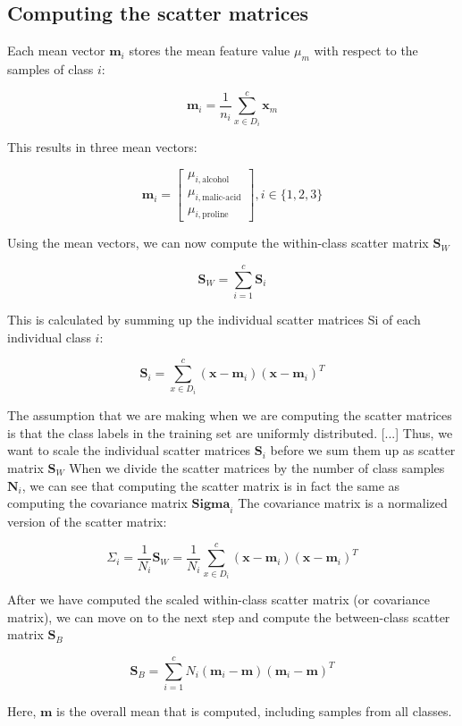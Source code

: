 \documentclass[letterpaper]{report}
\begin{document}
\subsection{Computing the scatter matrices}

Each mean vector $\mathbf{m}_i$ stores the mean feature value $\mu_m$ with respect to the samples of class $i$:

\[
\mathbf{m}_i = \frac{1}{n_i} \sum_{x \in D_i}^{c} \mathbf{x}_m
\]

This results in three mean vectors:

\[
\mathbf{m}_i = \begin{bmatrix} 
\mu_{i, \text{alcohol}} \\
\mu_{i, \text{malic-acid}} \\
\mu_{i, \text{proline}} 
 \end{bmatrix}, i  \in   \{ 1, 2, 3 \}
\]

Using the mean vectors, we can now compute the within-class scatter matrix $\mathbf{S}_W$

\[
\mathbf{S}_W = \sum^{c}_{i=1} \mathbf{S}_i
\]

This is calculated by summing up the individual scatter matrices Si of each
individual class $i$:

\[
\mathbf{S}_i = \sum_{x \in D_i}^{c} (\mathbf{x} - \mathbf{m}_i) (\mathbf{x} - \mathbf{m}_i)^T
\]

The assumption that we are making when we are computing the scatter matrices is that the class labels in the training set are uniformly distributed. [...] Thus, we want to scale the individual scatter matrices $\mathbf{S}_i$ before we sum them up as scatter matrix $\mathbf{S}_W$ When we divide the scatter matrices by the number of class samples $\mathbf{N}_i$, we can see that computing the scatter matrix is in fact the same as computing the covariance matrix $\mathbf{Sigma}_i$ The covariance matrix is a normalized version of the scatter matrix:

\[
\Sigma_i = \frac{1}{N_i} \mathbf{S}_W = \frac{1}{N_i} \sum^{c}_{x \in D_i}  (\mathbf{x} - \mathbf{m}_i) (\mathbf{x} - \mathbf{m}_i)^T
\]

After we have computed the scaled within-class scatter matrix (or covariance matrix), we can move on to the next step and compute the between-class scatter matrix $\mathbf{S}_B$

\[
\mathbf{S}_B = \sum^{c}_{i=1} N_i (\mathbf{m}_i - \mathbf{m})(\mathbf{m}_i - \mathbf{m})^T
\]

Here, $\mathbf{m}$ is the overall mean that is computed, including samples from all classes.
\end{document}
